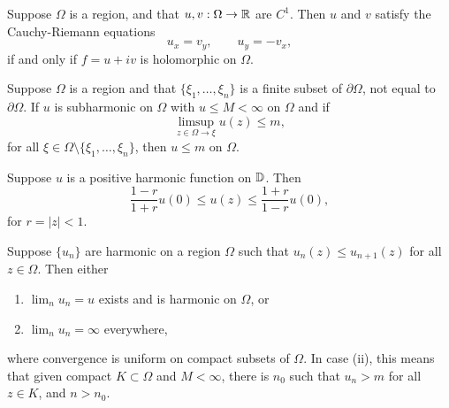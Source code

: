 \documentclass[12pt]{article}
\begin{document}
\begin{theorem}
    Suppose $\Omega$ is a region, and that $u,v:\Omega\to\mathbb{R}$ are $C^1$. Then $u$ and $v$ satisfy the Cauchy-Riemann equations 
    \begin{equation*}
        u_x=v_y,\qquad u_y=-v_x,
    \end{equation*}
    if and only if $f=u+iv$ is holomorphic on $\Omega$.
\end{theorem}

\begin{theorem}
    Suppose $\Omega$ is a region and that $\{\xi_1,\dots,\xi_n\}$ is a finite subset of $\partial\Omega$, not equal to $\partial\Omega$. If $u$ is subharmonic on $\Omega$ with $u\leq M<\infty$ on $\Omega$ and if 
    \begin{equation*}
        \limsup_{z\in\Omega\to\xi} u(z) \leq m,
    \end{equation*}
    for all $\xi\in\Omega\setminus\{\xi_1,\dots,\xi_n\}$, then $u\leq m$ on $\Omega$.
\end{theorem}

\begin{theorem}
    Suppose $u$ is a positive harmonic function on $\mathbb{D}$. Then
    \begin{equation*}
        \frac{1-r}{1+r}u(0)\leq u(z)\leq \frac{1+r}{1-r}u(0),
    \end{equation*}   
    for $r=|z|<1$.
\end{theorem}

\begin{theorem}
    Suppose $\{u_n\}$ are harmonic on a region $\Omega$ such that $u_n(z)\leq u_{n+1}(z)$ for all $z\in\Omega$. Then either
    \begin{enumerate}[label=(\roman*)]
        \item $\lim_n u_n = u$ exists and is harmonic on $\Omega$, or
        \item $\lim_n u_n = \infty$ everywhere,
    \end{enumerate}
    where convergence is uniform on compact subsets of $\Omega$. In case (ii), this means that given compact $K\subset \Omega$ and $M<\infty$, there is $n_0$ such that $u_n>m$ for all $z\in K$, and $n>n_0$.
\end{theorem}
\end{document}
